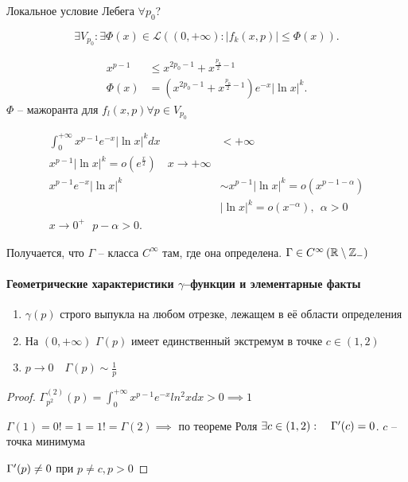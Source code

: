 \begin{note}
    Локальное условие Лебега $\forall p_0$?

    \[
    \exists V_{p_0}: \exists \Phi(x) \in \mathcal L \left( \left( 0, +\infty  \right): \left| f_k(x, p) \right| \leqslant \Phi(x)  \right)
    .\]

    \begin{align*}
        x^{p-1} & \leqslant x^{2p_0-1} + x^{\frac{p_0}{2}-1} \\
        \Phi(x) &= \left( x^{2p_0-1} + x^{\frac{p_0}{2}-1} \right)e^{-x}\left| \ln x \right| ^k.
    \end{align*}
    $\Phi$ -- мажоранта для $f_l(x, p) \forall p\in V_{p_0}$

    \begin{align*}
        \int_0^{+\infty }x^{p-1}e^{-x} \left| \ln x \right| ^kdx &< +\infty \\
        x^{p-1}|\ln x|^k = o(e^{\frac{x}{2}})\quad  x \to+\infty \\
        x^{p-1}e^{-x}\left| \ln x \right| ^k &\sim x^{p-1}\left| \ln x \right| ^k = o(x^{p-1-\alpha})\\
        &|\ln x |^k = o(x^{-\alpha}),~~ \alpha > 0\\
        x \to 0^{+}~~~ p -\alpha > 0.
        \end{align*}

    Получается, что $\Gamma$ -- класса $C^{\infty }$ там, где она определена. $\Gamma \in C^{\infty }\left( \mathbb{R}\setminus \mathbb{Z} _-  \right) $
\end{note}

\paragraph{Геометрические характеристики $\gamma$--функции и элементарные факты}

\begin{property}
\begin{enumerate}
    \item $\gamma(p)$ строго выпукла на любом отрезке, лежащем в её области определения
    \item На $(0, +\infty )$ $\Gamma(p)$ имеет единственный экстремум в точке $c\in (1, 2)$
    \item $p\to 0\quad \Gamma(p) \sim \frac{1}{p}$
\end{enumerate}
\end{property}
\begin{proof}
    $\Gamma^{(2)}_{p^2}(p) = \int_0^{+\infty }x^{p-1}e^{-x}ln^2x dx >0 \implies 1$

    $\Gamma(1) = 0! =1 = 1! = \Gamma(2) \implies $ по теореме Роля $\exists c\in (1, 2):\quad \Gamma^{\prime}(c) = 0$. $c$ -- точка минимума

    $\Gamma^{\prime}(p)\neq 0$ при $p\neq c, p>0$
\end{proof}

